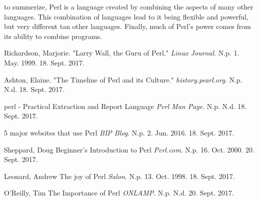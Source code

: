 \documentclass[12pt]{article}
\begin{document}
to summerize, Perl is a language created by combining the aspects of many other languages. This combination of languages lead to it being flexible and powerful, but very different tan other languages. Finally, much of Perl's power comes from its ability to combine programs.
\begin{thebibliography}{9}
Richardson, Marjorie. 
"Larry Wall, the Guru of Perl." 
\textit{Linux Journal}. 
N.p. 
1. May. 1999. 
18. Sept. 2017.

Ashton, Elaine.
"The Timeline of Perl and its Culture."
\textit{history.pearl.org}. 
N.p. 
N.d.
18. Sept. 2017.

perl - Practical Extraction and Report Language
\textit{Perl Man Page}. 
N.p. 
N.d.
18. Sept. 2017.

5 major websites that use Perl
\textit{BIP Blog}. 
N.p. 
2. Jun. 2016.
18. Sept. 2017.

Sheppard, Doug
Beginner's Introduction to Perl
\textit{Perl.com}. 
N.p. 
16. Oct. 2000.
20. Sept. 2017.

Leonard, Andrew
The joy of Perl
\textit{Salon}. 
N.p. 
13. Oct. 1998.
18. Sept. 2017.

O'Reilly, Tim
The Importance of Perl
\textit{ONLAMP}. 
N.p. 
N.d.
20. Sept. 2017.
\end{thebibliography}
\end{document}
